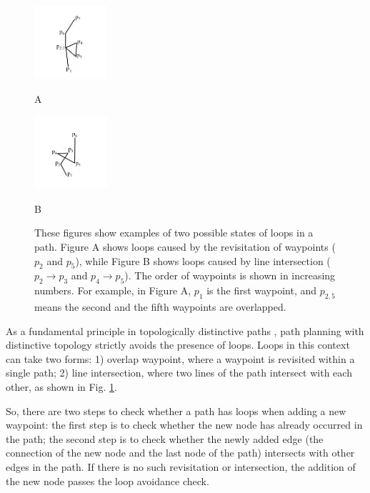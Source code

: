 \documentclass[letterpaper, 10 pt, journal, twoside]{IEEEtran}
\begin{document}
\begin{figure}[t]
\begin{minipage}{.48\linewidth}
  \centerline{\includegraphics[width=2.7cm, cframe=gray .2mm]{overlap_wp.png}}
  \centerline{A}
\end{minipage}
\hfill
\begin{minipage}{.48\linewidth}
  \centerline{\includegraphics[width=2.7cm, cframe=gray .2mm]{line_intersect.png}}
  \centerline{B}
\end{minipage}
\vfill
\caption{These figures show examples of two possible states of loops in a path. Figure A shows loops caused by the revisitation of waypoints ($p_2$ and $p_5$), while Figure B shows loops caused by line intersection ($p_2\rightarrow p_3$ and $p_4\rightarrow p_5$). The order of waypoints is shown in increasing numbers. For example, in Figure A, $p_{1}$ is the first waypoint, and $p_{2,5}$ means the second and the fifth waypoints are overlapped. }
\label{two_loops}
\end{figure}

As a fundamental principle in topologically distinctive paths \cite{bhattacharya2012topological}, path planning with distinctive topology strictly avoids the presence of loops. Loops in this context can take two forms: 1) overlap waypoint, where a waypoint is revisited within a single path; 2) line intersection, where two lines of the path intersect with each other, as shown in Fig. \ref{two_loops}.

So, there are two steps to check whether a path has loops when adding a new waypoint: the first step is to check whether the new node has already occurred in the path; the second step is to check whether the newly added edge (the connection of the new node and the last node of the path) intersects with other edges in the path. If there is no such revisitation or intersection, the addition of the new node passes the loop avoidance check.
\end{document}
